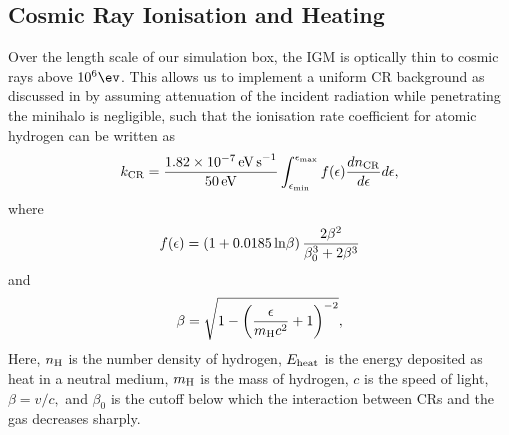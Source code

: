 \subsection{Cosmic Ray Ionisation and Heating}
\label{CRchem}
Over the length scale of our simulation box, the IGM is optically thin to cosmic rays above $10^6\ev$. This allows us to implement a uniform CR background as discussed in  by assuming attenuation of the incident radiation while penetrating the minihalo is negligible, such that the ionisation rate coefficient for atomic hydrogen \citep{Schlickeiser2002} can be written as
\begin{equation}
k_{\rm \small CR} = \frac{1.82\times10^{-7}\,{\rm \small eV\,s}^{-1}}{50\,{\rm \small eV}} 
    \int_{\epsilon_{\rm min}}^{\epsilon_{\rm max}} f(\epsilon) \frac{dn_{\rm \tiny CR}}{d\epsilon} d\epsilon,
\end{equation}
where
\begin{equation}    
    f(\epsilon) = (1 + 0.0185 \,{\rm ln}\beta )\, \frac{2 \beta^2}{\beta_0^3 + 2 \beta^3}
\end{equation}
and
\begin{equation}
    \beta =  \sqrt{1 - \left( \frac{\epsilon}{m_{\rm \tiny H}c^2}+1 \right)^{-2}},
\end{equation}
Here, $n_{\rm \small H}$ is the number density of hydrogen, $E_{\rm \small heat}$ is the energy deposited as heat in a neutral medium, $m_{\rm \small H}$ is the mass of hydrogen, $c$ is the speed of light, $\beta = v/c,$ and $\beta_0$ is the cutoff below which the interaction between CRs and the gas decreases sharply.
